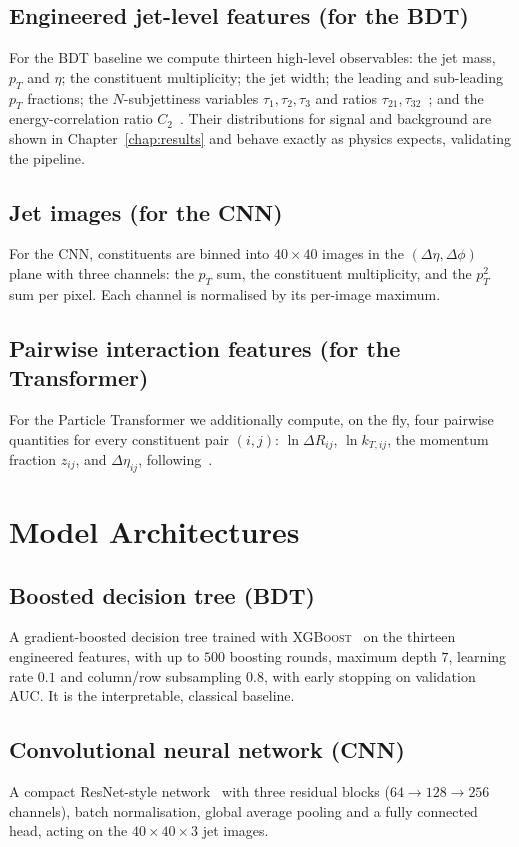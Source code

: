 \subsection{Engineered jet-level features (for the BDT)}
For the BDT baseline we compute thirteen high-level observables: the jet
mass, $p_T$ and $\eta$; the constituent multiplicity; the jet width; the
leading and sub-leading $p_T$ fractions; the $N$-subjettiness variables
$\tau_1,\tau_2,\tau_3$ and ratios $\tau_{21},\tau_{32}$~\citep{thaler2011};
and the energy-correlation ratio $C_2$~\citep{larkoski2013}. Their
distributions for signal and background are shown in
Chapter~\ref{chap:results} and behave exactly as physics expects, validating
the pipeline.

\subsection{Jet images (for the CNN)}
For the CNN, constituents are binned into $40\times40$ images in the
$(\Delta\eta,\Delta\phi)$ plane with three channels: the $p_T$ sum, the
constituent multiplicity, and the $p_T^2$ sum per pixel. Each channel is
normalised by its per-image maximum.

\subsection{Pairwise interaction features (for the Transformer)}
For the Particle Transformer we additionally compute, on the fly, four
pairwise quantities for every constituent pair $(i,j)$:
$\ln\Delta R_{ij}$, $\ln k_{T,ij}$, the momentum fraction $z_{ij}$, and
$\Delta\eta_{ij}$, following~\citet{qu2022particletransformer}.

\section{Model Architectures}
\label{sec:models}

\subsection{Boosted decision tree (BDT)}
A gradient-boosted decision tree trained with
\textsc{XGBoost}~\citep{chen2016xgboost} on the thirteen engineered features,
with up to $500$ boosting rounds, maximum depth $7$, learning rate $0.1$ and
column/row subsampling $0.8$, with early stopping on validation AUC. It is
the interpretable, classical baseline.

\subsection{Convolutional neural network (CNN)}
A compact ResNet-style network~\citep{he2016resnet} with three residual
blocks ($64\rightarrow128\rightarrow256$ channels), batch normalisation,
global average pooling and a fully connected head, acting on the
$40\times40\times3$ jet images.


